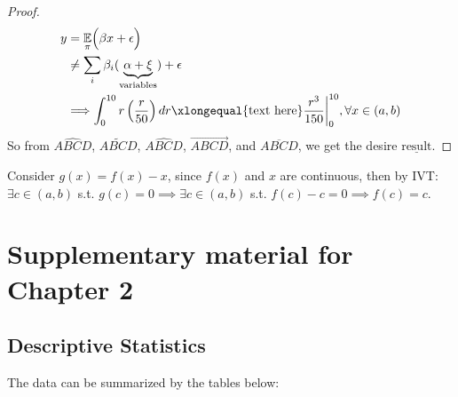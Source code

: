 \documentclass[letterpaper]{report}
\newcommand{\E}{\mathbb{E}}
\begin{document}
\begin{appendices}
\begin{proof}
    \vspace*{-1.7cm}
    
    \begin{align}\label{myEquation}
      \nonumber y&=\underset{\pi}{\E}\Big(\beta x + \epsilon\Big)\\
      \nonumber &\neq\sum\limits_{i}\beta_i(\underbrace{\alpha+\xi}_{\text{variables}}) + \epsilon\\
      &\Longrightarrow \int_{0}^{10}r \left( \dfrac{r}{50} \right)dr\xlongequal{\text{text here}}\dfrac{r^{3}}{150}\biggr\rvert^{10}_{0}, \forall x\in (a,b)
    \end{align}
    So from $\widehat{ABCD}$, $\widetilde{ABCD}$, $\widehat{ABCD}$, $\overrightarrow{ABCD}$, and $\overline{ABCD}$, we get the desire $\underline{\text{result}}$.
  \end{proof}
  
  \begin{framed}
  Consider $g(x)=f(x)-x$, since $f(x)$ and $x$ are continuous, then by IVT: $\exists c\in(a,b)$ s.t. $g(c)=0\implies \exists c\in(a,b)$ s.t. $f(c)-c=0\implies f(c)=c.$
\end{framed}
  
  \chapter{Supplementary material for Chapter 2}
  
  \setcounter{table}{0}
  
  \section{Descriptive Statistics}
  
  The data can be summarized by the tables below:
  

\end{appendices}
\end{document}
